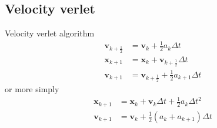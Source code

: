 \subsection{Velocity verlet}
Velocity verlet algorithm
\begin{align}
\mathbf{v}_{k+\frac{1}{2}} &= \mathbf{v}_{k} + \frac{1}{2} a_{k} \Delta t \\
\mathbf{x}_{k+1} &= \mathbf{x}_{k} + \mathbf{v}_{k+\frac{1}{2}} \Delta t \\
\mathbf{v}_{k+1} &= \mathbf{v}_{k+\frac{1}{2}} + \frac{1}{2} a_{k+1} \Delta t
\end{align}
or more simply
\begin{align}
\mathbf{x}_{k+1} &= \mathbf{x}_{k} + \mathbf{v}_{k} \Delta t + \frac{1}{2} a_{k} \Delta t^{2} \\
\mathbf{v}_{k+1} &= \mathbf{v}_{k} + \frac{1}{2} \left(a_{k} + a_{k+1}\right) \Delta t \\
\end{align}
